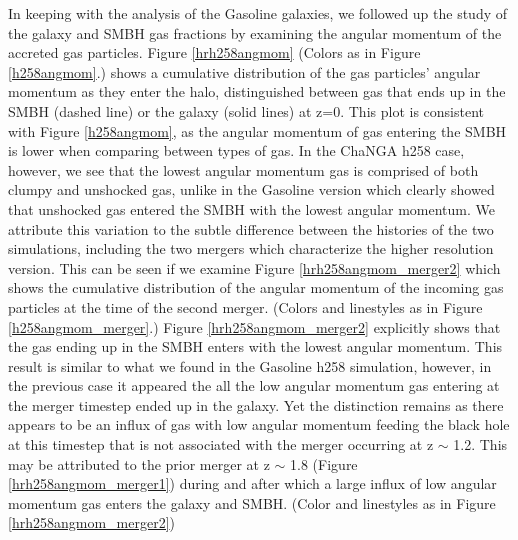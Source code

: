 \documentclass[12pt,headA,chapB]{fiskthesis}
\begin{document}
In keeping with the analysis of the Gasoline galaxies, we followed up the study of the galaxy and SMBH gas fractions by examining the angular momentum of the accreted gas particles. Figure \ref{hrh258angmom} (Colors as in Figure \ref{h258angmom}.) shows a cumulative distribution of the gas particles' angular momentum as they enter the halo, distinguished between gas that ends up in the SMBH (dashed line) or the galaxy (solid lines) at z=0. This plot is consistent with Figure \ref{h258angmom}, as the angular momentum of gas entering the SMBH is lower when comparing between types of gas. In the ChaNGA h258 case, however, we see that the lowest angular momentum gas is comprised of both clumpy and unshocked gas, unlike in the Gasoline version which clearly showed that unshocked gas entered the SMBH with the lowest angular momentum. We attribute this variation to the subtle difference between the histories of the two simulations, including the two mergers which characterize the higher resolution version. This can be seen if we examine Figure \ref{hrh258angmom_merger2} which shows the cumulative distribution of the angular momentum of the incoming gas particles at the time of the second merger. (Colors and linestyles as in Figure \ref{h258angmom_merger}.) Figure \ref{hrh258angmom_merger2} explicitly shows that the gas ending up in the SMBH enters with the lowest angular momentum. This result is similar to what we found in the Gasoline h258 simulation, however, in the previous case it appeared the all the low angular momentum gas entering at the merger timestep ended up in the galaxy. Yet the distinction remains as there appears to be an influx of gas with low angular momentum feeding the black hole at this timestep that is not associated with the merger occurring at z $\sim$ 1.2. This may be attributed to the prior merger at z $\sim$ 1.8 (Figure \ref{hrh258angmom_merger1}) during and after which a large influx of low angular momentum gas enters the galaxy and SMBH. (Color and linestyles as in Figure \ref{hrh258angmom_merger2}) 
\end{document}
